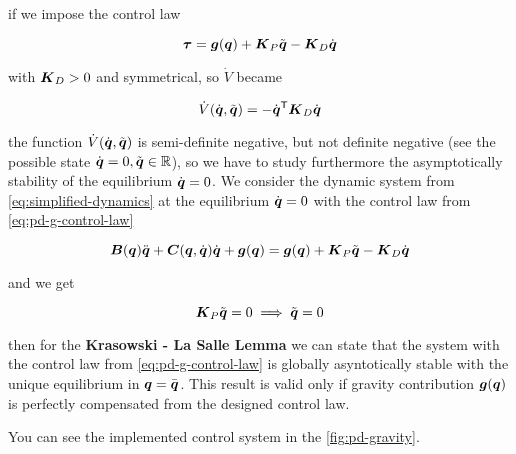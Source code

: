 if we impose the control law

\begin{equation}
    \boldsymbol{\tau} = \boldsymbol{g}(\boldsymbol{q}) + \boldsymbol{K}_P \tilde {\boldsymbol{q}} - \boldsymbol{K}_D\dot{\boldsymbol{q}} \label{eq:pd-g-control-law}
\end{equation}

with $\boldsymbol{K}_D > 0$ and symmetrical, so $\dot V$ became

\[
	\dot V(\dot{\boldsymbol{q}}, \tilde{\boldsymbol{q}}) = - \dot{\boldsymbol{q}}^{\mathsf{T}} \boldsymbol{K}_D \dot{\boldsymbol{q}}
\]

the function $\dot V(\dot{\boldsymbol{q}}, \tilde{\boldsymbol{q}})$ is semi-definite negative, but not definite negative (see the possible state $\dot{\boldsymbol{q}} = 0, \tilde{\boldsymbol{q}} \in \mathbb{R}$), so we have to study furthermore the asymptotically stability of the equilibrium $\dot{\boldsymbol{q}}=0$.
We consider the dynamic system from \autoref{eq:simplified-dynamics} at the equilibrium $\dot{\boldsymbol{q}}=0$ with the control law from \autoref{eq:pd-g-control-law}

\[
	\boldsymbol{B}(\boldsymbol{q})\ddot{\boldsymbol{q}} + \boldsymbol{C}(\boldsymbol{q},\dot{\boldsymbol{q}})\dot{\boldsymbol{q}} + \boldsymbol{g}(\boldsymbol{q}) = \boldsymbol{g}(\boldsymbol{q}) + \boldsymbol{K}_P \tilde {\boldsymbol{q}} - \boldsymbol{K}_D\dot{\boldsymbol{q}}
\]

and we get

\[
	\boldsymbol{K}_P \tilde {\boldsymbol{q}} = 0 \implies \tilde {\boldsymbol{q}} = 0
\]

then for the \textbf{Krasowski - La Salle Lemma} we can state that the system with the control law from \autoref{eq:pd-g-control-law} is globally asyntotically stable with the unique equilibrium in $\boldsymbol{q} = \bar {\boldsymbol{q}}$.
This result is valid only if gravity contribution $\boldsymbol{g}(\boldsymbol{q})$ is perfectly compensated from the designed control law.

You can see the implemented control system in the \autoref{fig:pd-gravity}.

